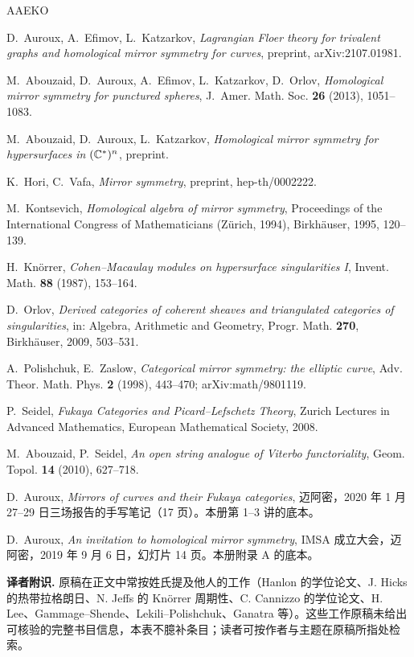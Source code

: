 
\begin{thebibliography}{AAEKO}

D.~Auroux, A.~Efimov, L.~Katzarkov,
\emph{Lagrangian Floer theory for trivalent graphs and homological mirror symmetry for curves},
preprint, arXiv:2107.01981.

M.~Abouzaid, D.~Auroux, A.~Efimov, L.~Katzarkov, D.~Orlov,
\emph{Homological mirror symmetry for punctured spheres},
J.~Amer. Math. Soc. \textbf{26} (2013), 1051--1083.

M.~Abouzaid, D.~Auroux, L.~Katzarkov,
\emph{Homological mirror symmetry for hypersurfaces in $(\mathbb{C}^*)^n$},
preprint.

K.~Hori, C.~Vafa,
\emph{Mirror symmetry},
preprint, hep-th/0002222.

M.~Kontsevich,
\emph{Homological algebra of mirror symmetry},
Proceedings of the International Congress of Mathematicians (Z\"urich, 1994), Birkh\"auser, 1995, 120--139.

H.~Kn\"orrer,
\emph{Cohen--Macaulay modules on hypersurface singularities I},
Invent. Math. \textbf{88} (1987), 153--164.

D.~Orlov,
\emph{Derived categories of coherent sheaves and triangulated categories of singularities},
in: Algebra, Arithmetic and Geometry, Progr. Math. \textbf{270}, Birkh\"auser, 2009, 503--531.

A.~Polishchuk, E.~Zaslow,
\emph{Categorical mirror symmetry: the elliptic curve},
Adv. Theor. Math. Phys. \textbf{2} (1998), 443--470; arXiv:math/9801119.

P.~Seidel,
\emph{Fukaya Categories and Picard--Lefschetz Theory},
Zurich Lectures in Advanced Mathematics, European Mathematical Society, 2008.

M.~Abouzaid, P.~Seidel,
\emph{An open string analogue of Viterbo functoriality},
Geom. Topol. \textbf{14} (2010), 627--718.

D.~Auroux,
\emph{Mirrors of curves and their Fukaya categories},
迈阿密，2020 年 1 月 27--29 日三场报告的手写笔记（17 页）。本册第 1--3 讲的底本。

D.~Auroux,
\emph{An invitation to homological mirror symmetry},
IMSA 成立大会，迈阿密，2019 年 9 月 6 日，幻灯片 14 页。本册附录 A 的底本。

\end{thebibliography}

\noindent\textbf{译者附识.} 原稿在正文中常按姓氏提及他人的工作（Hanlon 的学位论文、J. Hicks 的热带拉格朗日、N. Jeffs 的 Kn\"orrer 周期性、C. Cannizzo 的学位论文、H. Lee、Gammage--Shende、Lekili--Polishchuk、Ganatra 等）。这些工作原稿未给出可核验的完整书目信息，本表不臆补条目；读者可按作者与主题在原稿所指处检索。
